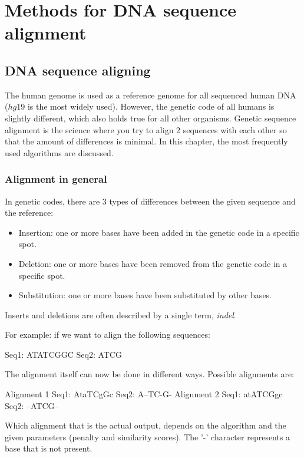 
\chapter{Methods for DNA sequence alignment}
\label{ch:algoverzicht}


\section{DNA sequence aligning}

The human genome is used as a reference genome for all sequenced human DNA ($hg19$ is the most widely used). However, the genetic code of all humans is slightly different, which also holds true for all other organisms. Genetic sequence alignment is the science where you try to align 2 sequences with each other so that the amount of differences is minimal. In this chapter, the most frequently used algorithms are discussed.

\subsection{Alignment in general}

In genetic codes, there are 3 types of differences between the given sequence and the reference:

\begin{itemize}
	\item Insertion: one or more bases have been added in the genetic code in a specific spot.
	\item Deletion: one or more bases have been removed from the genetic code in a specific spot.
	\item Substitution: one or more bases have been substituted by other bases.
\end{itemize}

Inserts and deletions are often described by a single term, \emph{indel}.

For example: if we want to align the following sequences:
\begin{lcverbatim}
Seq1: ATATCGGC
Seq2: ATCG
\end{lcverbatim}
The alignment itself can now be done in different ways. Possible alignments are:
\begin{lcverbatim}
Alignment 1
Seq1: AtaTCgGc
Seq2: A--TC-G-
Alignment 2
Seq1: atATCGgc
Seq2: --ATCG--
\end{lcverbatim}
Which alignment that is the actual output, depends on the algorithm and the given parameters (penalty and similarity scores). The '-' character represents a base that is not present.

